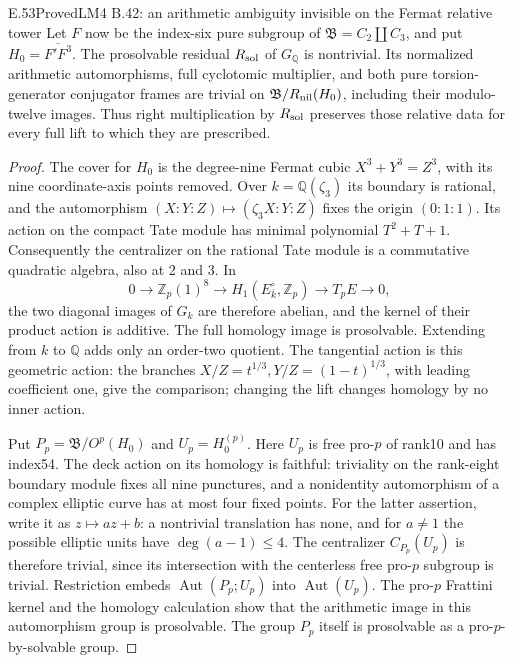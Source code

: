 \begin{result}{E.53}{Proved}{LM4 B.42: an arithmetic ambiguity invisible on the Fermat relative tower}
Let \(F\) now be the index-six pure subgroup of
\(\mathfrak B=C_2\amalg C_3\), and put \(H_0=\overline{F'F^3}\).
The prosolvable residual \(R_{\rm sol}\) of \(G_{\mathbb Q}\) is
nontrivial. Its normalized arithmetic automorphisms, full cyclotomic
multiplier, and both pure torsion-generator conjugator frames are trivial
on \(\mathfrak B/R_{\rm nil}(H_0)\), including their modulo-twelve
images. Thus right multiplication by \(R_{\rm sol}\) preserves those
relative data for every full lift to which they are prescribed.
\end{result}
\begin{proof}
The cover for \(H_0\) is the degree-nine Fermat cubic
\(X^3+Y^3=Z^3\), with its nine coordinate-axis points removed.
Over \(k=\mathbb Q(\zeta_3)\) its boundary is rational, and the
automorphism \((X:Y:Z)\mapsto(\zeta_3X:Y:Z)\) fixes the origin
\((0:1:1)\). Its action on the compact Tate module has minimal
polynomial \(T^2+T+1\). Consequently the centralizer on the rational
Tate module is a commutative quadratic algebra, also at 2 and 3. In
\[
 0\longrightarrow\mathbb Z_p(1)^8\longrightarrow
 H_1(E^\circ_{\bar k},\mathbb Z_p)
 \longrightarrow T_pE\longrightarrow0,
\]
the two diagonal images of \(G_k\) are therefore abelian, and the
kernel of their product action is additive. The full homology image
is prosolvable. Extending from \(k\) to \(\mathbb Q\) adds only
an order-two quotient. The tangential action is this geometric action:
the branches \(X/Z=t^{1/3},Y/Z=(1-t)^{1/3}\), with leading coefficient
one, give the comparison; changing the lift changes homology by no
inner action.

Put \(P_p=\mathfrak B/O^p(H_0)\) and \(U_p=H_0^{(p)}\).
Here \(U_p\) is free pro-\(p\) of rank10 and has index54.
The deck action on its homology is faithful: triviality on the
rank-eight boundary module fixes all nine punctures, and a nonidentity
automorphism of a complex elliptic curve has at most four fixed points.
For the latter assertion, write it as \(z\mapsto az+b\): a nontrivial
translation has none, and for \(a\ne1\) the possible elliptic units
have \(\deg(a-1)\le4\).
The centralizer \(C_{P_p}(U_p)\) is therefore trivial, since its
intersection with the centerless free pro-\(p\) subgroup is trivial.
Restriction embeds \(\operatorname{Aut}(P_p;U_p)\) into
\(\operatorname{Aut}(U_p)\). The pro-\(p\) Frattini kernel and the
homology calculation show that the arithmetic image in this
automorphism group is prosolvable. The group \(P_p\) itself is
prosolvable as a pro-\(p\)-by-solvable group.


\end{proof}
